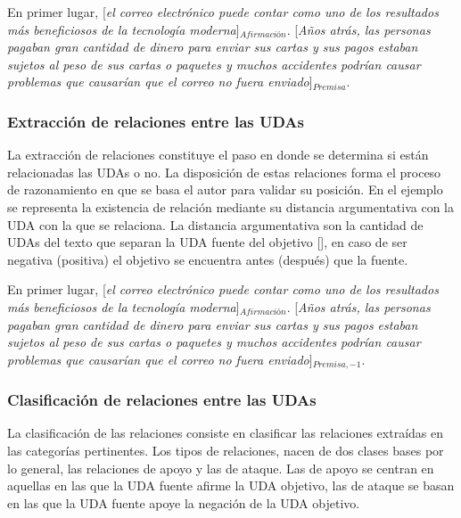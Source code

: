 \begin{adjustwidth}{25pt}{25pt}
    En primer lugar, [\emph{el correo electrónico puede contar como uno de los resultados
    más beneficiosos de la tecnología moderna}]$_{Afirmación}$. [\emph{Años atrás, las personas pagaban gran cantidad de dinero para 
    enviar sus cartas y sus pagos estaban sujetos al peso de sus cartas o paquetes y muchos accidentes podrían 
    causar problemas que causarían que el correo no fuera enviado}]$_{Premisa}$.
\end{adjustwidth}

\subsubsection{Extracción de relaciones entre las UDAs}

La extracción de relaciones constituye el paso en donde se determina si están relacionadas las UDAs o no. 
La disposición de estas relaciones forma el proceso de razonamiento en que se basa el autor para validar 
su posición. En el ejemplo se representa la existencia de relación mediante su distancia argumentativa con 
la UDA con la que se relaciona. La distancia argumentativa son la cantidad de UDAs del texto que separan la 
UDA fuente del objetivo [\cite{galassi2021deep}], en caso de ser negativa (positiva) el objetivo se encuentra 
antes (después) que la fuente.

\begin{adjustwidth}{25pt}{25pt}
    En primer lugar, [\emph{el correo electrónico puede contar como uno de los resultados
    más beneficiosos de la tecnología moderna}]$_{Afirmación}$. [\emph{Años atrás, las personas pagaban gran cantidad de dinero para 
    enviar sus cartas y sus pagos estaban sujetos al peso de sus cartas o paquetes y muchos accidentes podrían 
    causar problemas que causarían que el correo no fuera enviado}]$_{Premisa, -1}$.
\end{adjustwidth}

\subsubsection{Clasificación de relaciones entre las UDAs}

La clasificación de las relaciones consiste en clasificar las relaciones extraídas en las categorías pertinentes.
Los tipos de relaciones, nacen de dos clases bases por lo general, las relaciones de apoyo y las de ataque.
Las de apoyo se centran en aquellas en las que la UDA fuente afirme la UDA objetivo, las de ataque se basan en 
las que la UDA fuente apoye la negación de la UDA objetivo.

